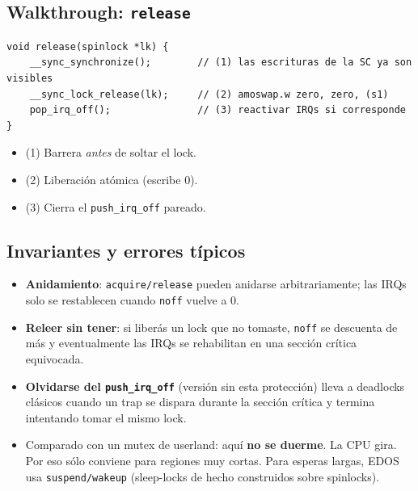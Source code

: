\documentclass[11pt,a4paper]{article}
\begin{document}
\subsection*{Walkthrough: \texttt{release}}

\begin{lstlisting}[style=cstyle]
void release(spinlock *lk) {
    __sync_synchronize();        // (1) las escrituras de la SC ya son visibles
    __sync_lock_release(lk);     // (2) amoswap.w zero, zero, (s1)
    pop_irq_off();               // (3) reactivar IRQs si corresponde
}
\end{lstlisting}

\begin{itemize}[nosep,leftmargin=*]
    \item (1) Barrera \emph{antes} de soltar el lock.
    \item (2) Liberación atómica (escribe 0).
    \item (3) Cierra el \texttt{push\_irq\_off} pareado.
\end{itemize}

\subsection*{Invariantes y errores típicos}

\begin{itemize}[leftmargin=*]
    \item \textbf{Anidamiento}: \texttt{acquire/release} pueden
        anidarse arbitrariamente; las IRQs solo se restablecen
        cuando \texttt{noff} vuelve a 0.
    \item \textbf{Releer sin tener}: si liberás un lock que no
        tomaste, \texttt{noff} se descuenta de más y eventualmente
        las IRQs se rehabilitan en una sección crítica equivocada.
    \item \textbf{Olvidarse del \texttt{push\_irq\_off}} (versión
        sin esta protección) lleva a deadlocks clásicos cuando un
        trap se dispara durante la sección crítica y termina
        intentando tomar el mismo lock.
    \item Comparado con un mutex de userland: aquí \textbf{no se
        duerme}. La CPU gira. Por eso sólo conviene para regiones
        muy cortas. Para esperas largas, EDOS usa
        \texttt{suspend/wakeup} (sleep-locks de hecho construidos
        sobre spinlocks).
\end{itemize}

\end{document}
